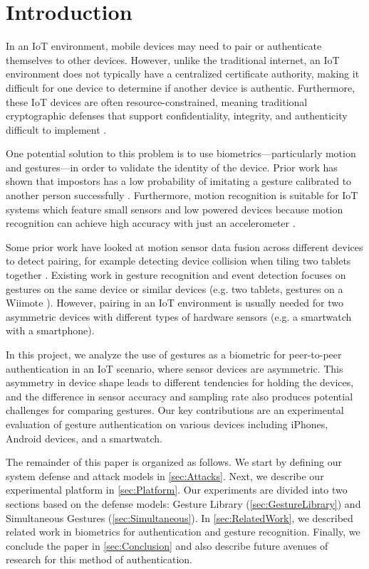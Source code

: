 
\section{Introduction}
\label{sec:Introduction}

In an \gls{IoT} environment, mobile devices may need to pair or authenticate themselves to other devices. However, unlike the traditional internet, an \gls{IoT} environment does not typically have a centralized certificate authority, making it difficult for one device to determine if another device is authentic. Furthermore, these \gls{IoT} devices are often resource-constrained, meaning traditional cryptographic defenses that support confidentiality, integrity, and authenticity difficult to implement \cite{cisco:iot-pf,authmodels}.

One potential solution to this problem is to use biometrics---particularly motion and gestures---in order to validate the identity of the device. Prior work has shown that impostors has a low probability of imitating a gesture calibrated to another person successfully \cite{Casanova}. Furthermore, motion recognition is suitable for \gls{IoT} systems which feature small sensors and low powered devices because motion recognition can achieve high accuracy with just an accelerometer \cite{RuizeXu}. 

Some prior work have looked at motion sensor data fusion across different devices to detect pairing, for example detecting device collision when tiling two tablets together \cite{SyncGes}. Existing work in gesture recognition and event detection focuses on gestures on the same device or similar devices (e.g. two tablets, gestures on a Wiimote \cite{LiuuWave}). However, pairing in an \gls{IoT} environment is usually needed for two asymmetric devices with different types of hardware sensors (e.g. a smartwatch with a smartphone).

In this project, we analyze the use of gestures as a biometric for peer-to-peer authentication in an \gls{IoT} scenario, where sensor devices are asymmetric. This asymmetry in device shape leads to different tendencies for holding the devices, and the difference in sensor accuracy and sampling rate also produces potential challenges for comparing gestures. Our key contributions are an experimental evaluation of gesture authentication on various devices including iPhones, Android devices, and a smartwatch.

The remainder of this paper is organized as follows. We start by defining our system defense and attack models in \autoref{sec:Attacks}. Next, we describe our experimental platform in \autoref{sec:Platform}. Our experiments are divided into two sections based on the defense models: Gesture Library (\autoref{sec:GestureLibrary}) and Simultaneous Gestures (\autoref{sec:Simultaneous}). In \autoref{sec:RelatedWork}, we described related work in biometrics for authentication and gesture recognition. Finally, we conclude the paper in \autoref{sec:Conclusion} and also describe future avenues of research for this method of authentication.